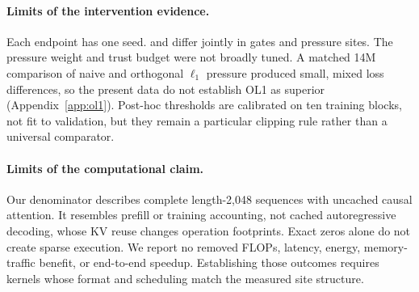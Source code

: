 \paragraph{Limits of the intervention evidence.}
Each endpoint has one seed.  \Afour{} and \Aseven{} differ jointly in gates and
pressure sites.  The pressure weight and trust budget were not broadly tuned.
A matched 14M comparison of naive and orthogonal $\ell_1$ pressure produced
small, mixed loss differences, so the present data do not establish OL1 as
superior (Appendix~\ref{app:ol1}).  Post-hoc thresholds are calibrated on ten
training blocks, not fit to validation, but they remain a particular clipping
rule rather than a universal comparator.

\paragraph{Limits of the computational claim.}
Our denominator describes complete length-2,048 sequences with uncached causal
attention.  It resembles prefill or training accounting, not cached
autoregressive decoding, whose KV reuse changes operation footprints.  Exact
zeros alone do not create sparse execution.  We report no removed FLOPs,
latency, energy, memory-traffic benefit, or end-to-end speedup.  Establishing
those outcomes requires kernels whose format and scheduling match the measured
site structure.

